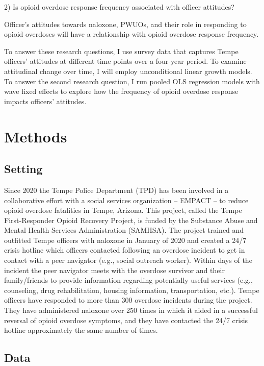 2) Is opioid overdose response frequency associated with officer attitudes? 

\begin{hypothesis}  
Officer's attitudes towards naloxone, PWUOs, and their role in responding to opioid overdoses will have a relationship with opioid overdose response frequency.
\end{hypothesis}

To answer these research questions, I use survey data that captures Tempe officers’ attitudes at different time points over a four-year period. To examine attitudinal change over time, I will employ unconditional linear growth models. To answer the second research question, I run pooled OLS regression models with wave fixed effects to explore how the frequency of opioid overdose response impacts officers’ attitudes.

\section{Methods}
\subsection{Setting}

Since 2020 the Tempe Police Department (TPD) has been involved in a collaborative effort with a social services organization – EMPACT – to reduce opioid overdose fatalities in Tempe, Arizona. This project, called the Tempe First-Responder Opioid Recovery Project, is funded by the Substance Abuse and Mental Health Services Administration (SAMHSA). The project trained and outfitted Tempe officers with naloxone in January of 2020 and created a 24/7 crisis hotline which officers contacted following an overdose incident to get in contact with a peer navigator (e.g., social outreach worker). Within days of the incident the peer navigator meets with the overdose survivor and their family/friends to provide information regarding potentially useful services (e.g., counseling, drug rehabilitation, housing information, transportation, etc.). Tempe officers have responded to more than 300 overdose incidents during the project. They have administered naloxone over 250 times in which it aided in a successful reversal of opioid overdose symptoms, and they have contacted the 24/7 crisis hotline approximately the same number of times. 

\subsection{Data}

